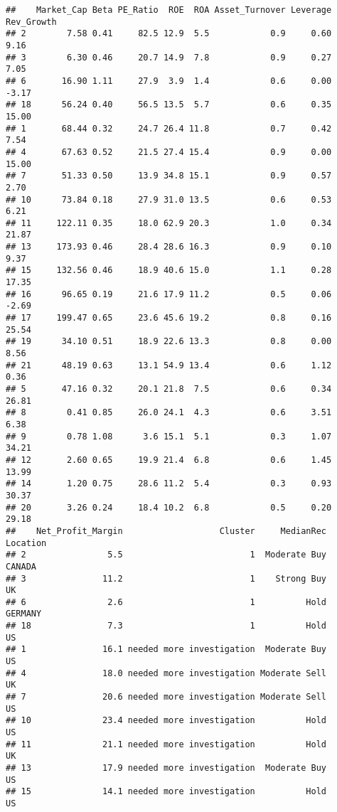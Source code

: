 \documentclass[
]{article}
\begin{document}
\begin{verbatim}
##    Market_Cap Beta PE_Ratio  ROE  ROA Asset_Turnover Leverage Rev_Growth
## 2        7.58 0.41     82.5 12.9  5.5            0.9     0.60       9.16
## 3        6.30 0.46     20.7 14.9  7.8            0.9     0.27       7.05
## 6       16.90 1.11     27.9  3.9  1.4            0.6     0.00      -3.17
## 18      56.24 0.40     56.5 13.5  5.7            0.6     0.35      15.00
## 1       68.44 0.32     24.7 26.4 11.8            0.7     0.42       7.54
## 4       67.63 0.52     21.5 27.4 15.4            0.9     0.00      15.00
## 7       51.33 0.50     13.9 34.8 15.1            0.9     0.57       2.70
## 10      73.84 0.18     27.9 31.0 13.5            0.6     0.53       6.21
## 11     122.11 0.35     18.0 62.9 20.3            1.0     0.34      21.87
## 13     173.93 0.46     28.4 28.6 16.3            0.9     0.10       9.37
## 15     132.56 0.46     18.9 40.6 15.0            1.1     0.28      17.35
## 16      96.65 0.19     21.6 17.9 11.2            0.5     0.06      -2.69
## 17     199.47 0.65     23.6 45.6 19.2            0.8     0.16      25.54
## 19      34.10 0.51     18.9 22.6 13.3            0.8     0.00       8.56
## 21      48.19 0.63     13.1 54.9 13.4            0.6     1.12       0.36
## 5       47.16 0.32     20.1 21.8  7.5            0.6     0.34      26.81
## 8        0.41 0.85     26.0 24.1  4.3            0.6     3.51       6.38
## 9        0.78 1.08      3.6 15.1  5.1            0.3     1.07      34.21
## 12       2.60 0.65     19.9 21.4  6.8            0.6     1.45      13.99
## 14       1.20 0.75     28.6 11.2  5.4            0.3     0.93      30.37
## 20       3.26 0.24     18.4 10.2  6.8            0.5     0.20      29.18
##    Net_Profit_Margin                   Cluster     MedianRec    Location
## 2                5.5                         1  Moderate Buy      CANADA
## 3               11.2                         1    Strong Buy          UK
## 6                2.6                         1          Hold     GERMANY
## 18               7.3                         1          Hold          US
## 1               16.1 needed more investigation  Moderate Buy          US
## 4               18.0 needed more investigation Moderate Sell          UK
## 7               20.6 needed more investigation Moderate Sell          US
## 10              23.4 needed more investigation          Hold          US
## 11              21.1 needed more investigation          Hold          UK
## 13              17.9 needed more investigation  Moderate Buy          US
## 15              14.1 needed more investigation          Hold          US

\end{verbatim}
\end{document}
